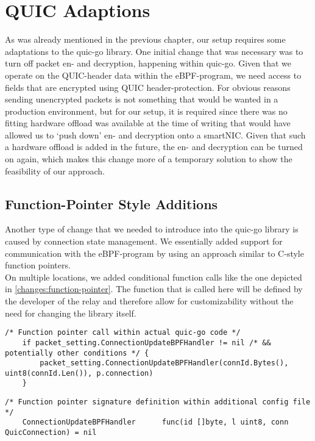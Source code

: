 \section{QUIC Adaptions}\label{sec:quic_adaptions}
As was already mentioned in the previous chapter, our setup requires some adaptations
to the quic-go library.
One initial change that was necessary was to turn off packet en- and decryption, 
happening within quic-go.
Given that we operate on the QUIC-header data within the eBPF-program, we need access 
to fields that are encrypted using QUIC header-protection.
For obvious reasons sending unencrypted packets is not something that would be wanted in 
a production environment, but for our setup, it is required since there was no fitting hardware offload 
was available at the time of writing that would have allowed us to `push down' en- and decryption 
onto a smartNIC\@.
Given that such a hardware offload is added in the future, the en- and decryption can be
turned on again, which makes this change more of a temporary solution to show the feasibility
of our approach.

\subsection{Function-Pointer Style Additions}
Another type of change that we needed to introduce into the quic-go library is caused by 
connection state management.
We essentially added support for communication with the eBPF-program by using an 
approach similar to C-style function pointers.
\\
On multiple locations, we added conditional function calls like the one depicted in 
\autoref{changes:function-pointer}.
The function that is called here will be defined by the developer of the relay and 
therefore allow for customizability without the need for changing the library itself.
\vspace{0.2cm}
\begin{lstlisting}[style=GoStyle, label=changes:function-pointer, caption=An example of a function-pointer addition to the quic-go library.]
    /* Function pointer call within actual quic-go code */
    if packet_setting.ConnectionUpdateBPFHandler != nil /* && potentially other conditions */ {
	    packet_setting.ConnectionUpdateBPFHandler(connId.Bytes(), uint8(connId.Len()), p.connection)
	}
\end{lstlisting}
\vspace{0.2cm}
\begin{lstlisting}[style=GoStyle, label=changes:signature-function-pointer, caption=Only the signature will be defined within the library itself.]
    /* Function pointer signature definition within additional config file */
	ConnectionUpdateBPFHandler      func(id []byte, l uint8, conn QuicConnection) = nil
\end{lstlisting}

